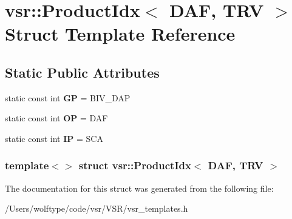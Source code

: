 \hypertarget{structvsr_1_1_product_idx_3_01_d_a_f_00_01_t_r_v_01_4}{\section{vsr\-:\-:Product\-Idx$<$ D\-A\-F, T\-R\-V $>$ Struct Template Reference}
\label{structvsr_1_1_product_idx_3_01_d_a_f_00_01_t_r_v_01_4}
}
\subsection*{Static Public Attributes}
\begin{DoxyCompactItemize}
\item 
\hypertarget{structvsr_1_1_product_idx_3_01_d_a_f_00_01_t_r_v_01_4_adb19d1a9bc2cc4d3b1bc992476e57d65}{static const int {\bfseries G\-P} = B\-I\-V\-\_\-\-D\-A\-P}\label{structvsr_1_1_product_idx_3_01_d_a_f_00_01_t_r_v_01_4_adb19d1a9bc2cc4d3b1bc992476e57d65}

\item 
\hypertarget{structvsr_1_1_product_idx_3_01_d_a_f_00_01_t_r_v_01_4_aacad12b2351c76aa0a9185948fd3fa1a}{static const int {\bfseries O\-P} = D\-A\-F}\label{structvsr_1_1_product_idx_3_01_d_a_f_00_01_t_r_v_01_4_aacad12b2351c76aa0a9185948fd3fa1a}

\item 
\hypertarget{structvsr_1_1_product_idx_3_01_d_a_f_00_01_t_r_v_01_4_aa2d2374c1fd92aabcec4c5d479ef7e04}{static const int {\bfseries I\-P} = S\-C\-A}\label{structvsr_1_1_product_idx_3_01_d_a_f_00_01_t_r_v_01_4_aa2d2374c1fd92aabcec4c5d479ef7e04}

\end{DoxyCompactItemize}
\subsubsection*{template$<$$>$ struct vsr\-::\-Product\-Idx$<$ D\-A\-F, T\-R\-V $>$}



The documentation for this struct was generated from the following file\-:\begin{DoxyCompactItemize}
\item 
/\-Users/wolftype/code/vsr/\-V\-S\-R/vsr\-\_\-templates.\-h\end{DoxyCompactItemize}
